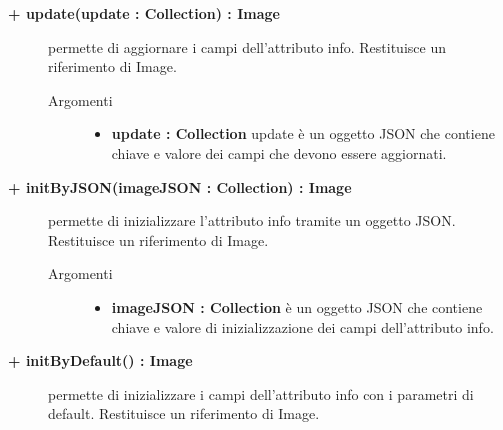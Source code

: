 \begin{description}
\begin{description}
\end{description}

\begin{description}
		\item[\textbf{\color{blue}+ update(update : Collection) : Image			}] \hfill
			permette di aggiornare i campi dell'attributo info. Restituisce un riferimento di Image.
			
		\begin{description}
			\item[Argomenti] \hfill
				\begin{itemize}
				
					\item \textbf{update : Collection			} \hfill
					update è un oggetto JSON che contiene chiave e valore dei campi che devono essere aggiornati. 
				\end{itemize}
		\end{description}

\end{description}

\begin{description}
		\item[\textbf{\color{blue}+ initByJSON(imageJSON : Collection) : Image			}] \hfill
			permette di inizializzare l'attributo info tramite un oggetto JSON. Restituisce un riferimento di Image.
			
		\begin{description}
			\item[Argomenti] \hfill
				\begin{itemize}
				
					\item \textbf{imageJSON : Collection			} \hfill
					è un oggetto JSON che contiene chiave e valore di inizializzazione dei campi dell'attributo info. 
				\end{itemize}
		\end{description}

\end{description}

\begin{description}
		\item[\textbf{\color{blue}+ initByDefault() : Image			}] \hfill
			permette di inizializzare i campi dell'attributo info con i parametri di default. Restituisce un riferimento di Image. 

\end{description}


\end{description}
